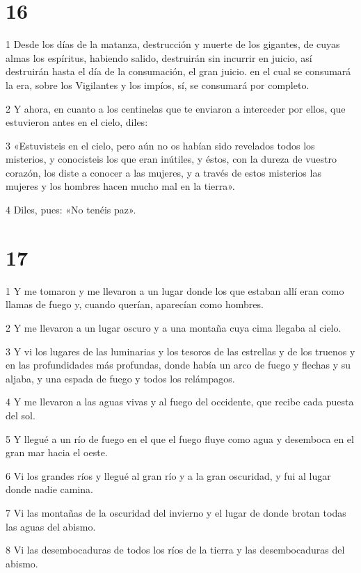 \chapter{16}

\par 1 Desde los días de la matanza, destrucción y muerte de los gigantes, de cuyas almas los espíritus, habiendo salido, destruirán sin incurrir en juicio, así destruirán hasta el día de la consumación, el gran juicio. en el cual se consumará la era, sobre los Vigilantes y los impíos, sí, se consumará por completo.
\par 2 Y ahora, en cuanto a los centinelas que te enviaron a interceder por ellos, que estuvieron antes en el cielo, diles:
\par 3 «Estuvisteis en el cielo, pero aún no os habían sido revelados todos los misterios, y conocisteis los que eran inútiles, y éstos, con la dureza de vuestro corazón, los diste a conocer a las mujeres, y a través de estos misterios las mujeres y los hombres hacen mucho mal en la tierra».
\par 4 Diles, pues: «No tenéis paz».

\chapter{17}

\par 1 Y me tomaron y me llevaron a un lugar donde los que estaban allí eran como llamas de fuego y, cuando querían, aparecían como hombres.
\par 2 Y me llevaron a un lugar oscuro y a una montaña cuya cima llegaba al cielo.
\par 3 Y vi los lugares de las luminarias y los tesoros de las estrellas y de los truenos y en las profundidades más profundas, donde había un arco de fuego y flechas y su aljaba, y una espada de fuego y todos los relámpagos.
\par 4 Y me llevaron a las aguas vivas y al fuego del occidente, que recibe cada puesta del sol.
\par 5 Y llegué a un río de fuego en el que el fuego fluye como agua y desemboca en el gran mar hacia el oeste.
\par 6 Vi los grandes ríos y llegué al gran río y a la gran oscuridad, y fui al lugar donde nadie camina.
\par 7 Vi las montañas de la oscuridad del invierno y el lugar de donde brotan todas las aguas del abismo.
\par 8 Vi las desembocaduras de todos los ríos de la tierra y las desembocaduras del abismo.

